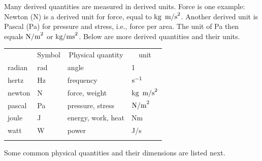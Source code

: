 \documentclass[graybox,envcountchap,sectrefs,final]{svmonodo}
\begin{document}
Many derived quantities are measured in derived units. Force is one
example: Newton (N) is a derived unit for force, equal to $\hbox{kg\,
m/s}^2$. Another derived unit is Pascal (Pa) for pressure and stress,
i.e., force per area. The unit of Pa then equals $\hbox{N/m}^2$ or
$\hbox{kg/ms}^2$. Below are more derived quantities and their units.



{\small   %

\vspace{4mm}

\begin{tabular}{llll}
\hline\noalign{\smallskip}
\multicolumn{1}{c}{ Name } & \multicolumn{1}{c}{ Symbol } & \multicolumn{1}{c}{ Physical quantity } & \multicolumn{1}{c}{ unit } \\
\noalign{\smallskip}\svhline\noalign{\smallskip}
radian & rad    & angle              & 1                   \\
hertz  & Hz     & frequency          & $\hbox{s}^{-1}$     \\
newton & N      & force, weight      & $\hbox{kg\, m/s}^2$ \\
pascal & Pa     & pressure, stress   & $\hbox{N/m}^2$      \\
joule  & J      & energy, work, heat & Nm                  \\
watt   & W      & power              & J/s                 \\
\noalign{\smallskip}\hline\noalign{\smallskip}
\end{tabular}

\vspace{4mm}

}


\noindent
Some common physical quantities and their dimensions are listed next.
\end{document}
